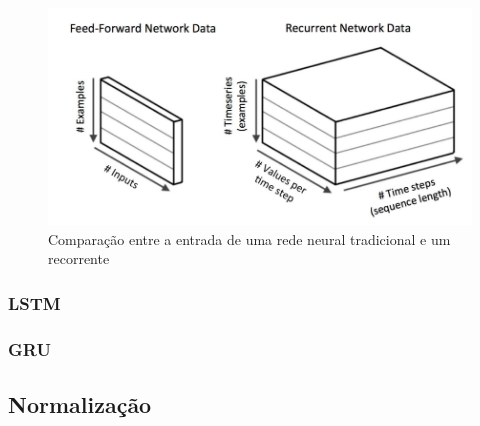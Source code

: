 \begin{figure}[H] 
  \includegraphics[width= 12cm]{../figuras/redes/input-rnn.png}
  \caption{Comparação entre a entrada de uma rede neural tradicional
  e um recorrente \cite{dl-oreilly}}
  \label{fig:input-rnn}
\end{figure}

\subsubsection{LSTM}


\subsubsection{GRU}


\subsection{Normalização}